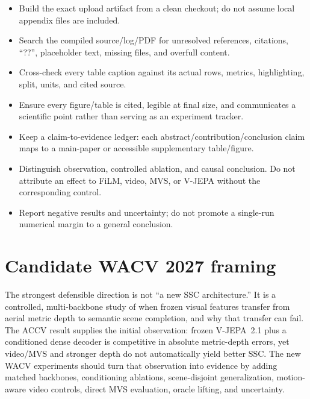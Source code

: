 \documentclass[10pt]{article}
\begin{document}
\begin{itemize}[leftmargin=*]
  \item Build the exact upload artifact from a clean checkout; do not assume local
  appendix files are included.
  \item Search the compiled source/log/PDF for unresolved references, citations, ``??'',
  placeholder text, missing files, and overfull content.
  \item Cross-check every table caption against its actual rows, metrics, highlighting,
  split, units, and cited source.
  \item Ensure every figure/table is cited, legible at final size, and communicates a
  scientific point rather than serving as an experiment tracker.
  \item Keep a claim-to-evidence ledger: each abstract/contribution/conclusion claim maps
  to a main-paper or accessible supplementary table/figure.
  \item Distinguish observation, controlled ablation, and causal conclusion. Do not
  attribute an effect to FiLM, video, MVS, or V-JEPA without the corresponding control.
  \item Report negative results and uncertainty; do not promote a single-run numerical
  margin to a general conclusion.
\end{itemize}

\section{Candidate WACV 2027 framing}

The strongest defensible direction is not ``a new SSC architecture.'' It is a controlled,
multi-backbone study of when frozen visual features transfer from aerial metric depth to
semantic scene completion, and why that transfer can fail. The ACCV result supplies the
initial observation: frozen V-JEPA~2.1 plus a conditioned dense decoder is competitive in
absolute metric-depth errors, yet video/MVS and stronger depth do not automatically yield
better SSC. The new WACV experiments should turn that observation into evidence by adding
matched backbones, conditioning ablations, scene-disjoint generalization, motion-aware
video controls, direct MVS evaluation, oracle lifting, and uncertainty.
\end{document}
